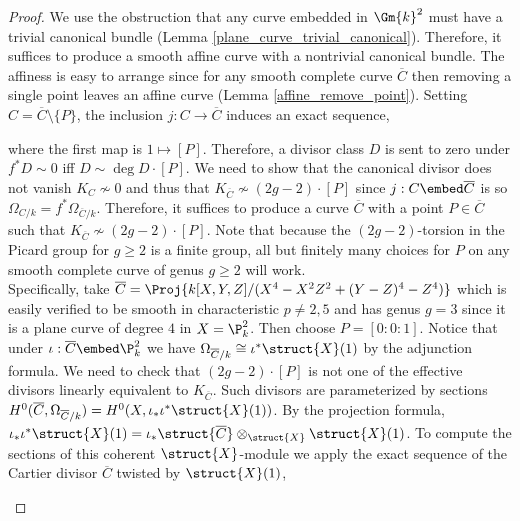 \begin{proof}
We use the obstruction that any curve embedded in $\Gm{k}^2$ must have a trivial canonical bundle (Lemma \ref{plane_curve_trivial_canonical}). Therefore, it suffices to produce a smooth affine curve with a nontrivial canonical bundle. The affiness is easy to arrange since for any smooth complete curve $\overline{C}$ then removing a single point leaves an affine curve (Lemma \ref{affine_remove_point}). Setting $C = \overline{C} \setminus \{ P \}$, the inclusion $j : C \to \overline{C}$ induces an exact sequence,
\begin{center}
\end{center}
where the first map is $1 \mapsto [P]$. Therefore, a divisor class $D$ is sent to zero under $f^* D \sim 0$ iff $D \sim \deg{D} \cdot [P]$. We need to show that the canonical divisor does not vanish $K_C \not \sim 0$ and thus that $K_{\overline{C}} \not\sim (2g - 2) \cdot [P]$ since $j : C \embed \overline{C}$ is \etale so $\Omega_{C/k} = f^* \Omega_{\overline{C}/k}$. Therefore, it suffices to produce a curve $\overline{C}$ with a point $P \in \overline{C}$ such that $K_{\overline{C}} \not\sim (2g - 2) \cdot [P]$. Note that because the $(2g - 2)$-torsion in the Picard group for $g \ge 2$ is a finite group, all but finitely many choices for $P$ on any smooth complete curve of genus $g \ge 2$ will work.
\bigskip\\
Specifically, take $\overline{C} = \Proj{k[X, Y, Z]/(X^4 - X^2 Z^2 + (Y - Z)^4 - Z^4)}$ which is easily verified to be smooth in characteristic $p \neq 2,5$ and has genus $g = 3$ since it is a plane curve of degree $4$ in $X = \P^2_k$. Then choose $P = [0 : 0 : 1]$. Notice that under $\iota : \overline{C} \embed \P^2_k$ we have $\Omega_{\overline{C}/k} \cong \iota^* \struct{X}(1)$ by the adjunction formula. We need to check that $(2g - 2) \cdot [P]$ is not one of the effective divisors linearly equivalent to $K_{\overline{C}}$. Such divisors are parameterized by sections $H^0(\overline{C}, \Omega_{\overline{C}/k}) = H^0(X, \iota_* \iota^* \struct{X}(1))$. By the projection formula, $\iota_* \iota^* \struct{X}(1) = \iota_* \struct{\overline{C}} \otimes_{\struct{X}} \struct{X}(1)$. To compute the sections of this coherent $\struct{X}$-module we apply the exact sequence of the Cartier divisor $\overline{C}$ twisted by $\struct{X}(1)$,
\begin{center}

\end{center}
\end{proof}
